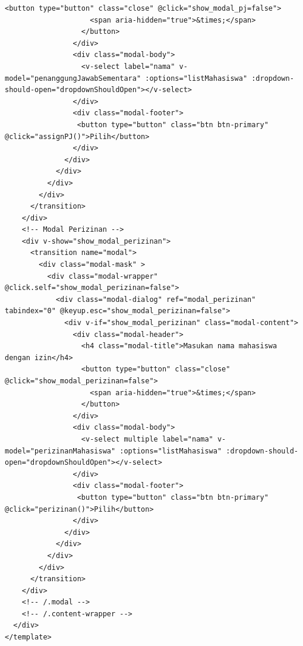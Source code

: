 \begin{lstlisting}[breaklines]
                  <button type="button" class="close" @click="show_modal_pj=false">
                    <span aria-hidden="true">&times;</span>
                  </button>
                </div>
                <div class="modal-body">
                  <v-select label="nama" v-model="penanggungJawabSementara" :options="listMahasiswa" :dropdown-should-open="dropdownShouldOpen"></v-select>
                </div>
                <div class="modal-footer">
                 <button type="button" class="btn btn-primary" @click="assignPJ()">Pilih</button>
                </div>
              </div>
            </div>
          </div>
        </div>
      </transition>
    </div>
    <!-- Modal Perizinan -->
    <div v-show="show_modal_perizinan">
      <transition name="modal">
        <div class="modal-mask" >
          <div class="modal-wrapper" @click.self="show_modal_perizinan=false">
            <div class="modal-dialog" ref="modal_perizinan" tabindex="0" @keyup.esc="show_modal_perizinan=false">
              <div v-if="show_modal_perizinan" class="modal-content">
                <div class="modal-header">
                  <h4 class="modal-title">Masukan nama mahasiswa dengan izin</h4>
                  <button type="button" class="close" @click="show_modal_perizinan=false">
                    <span aria-hidden="true">&times;</span>
                  </button>
                </div>
                <div class="modal-body">
                  <v-select multiple label="nama" v-model="perizinanMahasiswa" :options="listMahasiswa" :dropdown-should-open="dropdownShouldOpen"></v-select>
                </div>
                <div class="modal-footer">
                 <button type="button" class="btn btn-primary" @click="perizinan()">Pilih</button>
                </div>
              </div>
            </div>
          </div>
        </div>
      </transition>
    </div>
    <!-- /.modal -->
    <!-- /.content-wrapper -->
  </div>
</template>
\end{lstlisting}